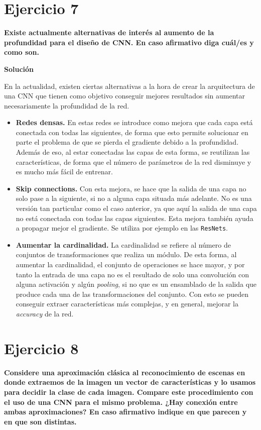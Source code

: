 \documentclass[11pt,a4paper]{article}
\newcommand{\answer}{\noindent\textbf{Solución}}
\newcommand{\question}[1]{\noindent\textbf{#1}}
\newcommand{\nonumsection}[1]{\section*{#1}\addcontentsline{toc}{section}{#1}}
\begin{document}
\nonumsection{Ejercicio 7}

\question{Existe actualmente alternativas de interés al aumento de la
profundidad para el diseño de CNN. En caso afirmativo diga cuál/es y
como son.}

\answer

En la actualidad, existen ciertas alternativas a la hora de crear la arquitectura
de una CNN que tienen como objetivo conseguir mejores resultados sin aumentar
necesariamente la profundidad de la red.

\begin{itemize}[label=\textbullet]
  \item \textbf{Redes densas.} \cite{DBLP:journals/corr/HuangLW16a}
  En estas redes se introduce como mejora
  que cada capa está conectada con todas las siguientes, de
  forma que esto permite solucionar en parte el problema de que se pierda
  el gradiente debido a la profundidad. Además de eso, al estar conectadas
  las capas de esta forma, se reutilizan las características, de forma que
  el número de parámetros de la red disminuye y es mucho más fácil de entrenar.
  \item \textbf{Skip connections.} Con esta mejora, se hace que la salida
  de una capa no solo pase a la siguiente, si no a alguna capa situada
  más adelante. No es una versión tan particular como el caso anterior,
  ya que aquí la salida de una capa no está conectada con todas las
  capas siguientes. Esta mejora también ayuda a propagar mejor el gradiente.
  Se utiliza por ejemplo en las \texttt{ResNets}.
  \item \textbf{Aumentar la cardinalidad.} \cite{DBLP:journals/corr/XieGDTH16}
  La cardinalidad se refiere al número de conjuntos de transformaciones que
  realiza un módulo. De esta forma, al aumentar la cardinalidad, el conjunto de
  operaciones se hace mayor, y por tanto la entrada de una capa no es el resultado
  de solo una convolución con alguna activación y algún \textit{pooling}, si no que
  es un ensamblado de la salida que produce cada una de las transformaciones del
  conjunto. Con esto se pueden conseguir extraer características más complejas,
  y en general, mejorar la \textit{accuracy} de la red.
\end{itemize}


\nonumsection{Ejercicio 8}

\question{Considere una aproximación clásica al reconocimiento de escenas
en donde extraemos de la imagen un vector de características y lo
usamos para decidir la clase de cada imagen. Compare este
procedimiento con el uso de una CNN para el mismo problema. ¿Hay
conexión entre ambas aproximaciones? En caso afirmativo indique en
que parecen y en que son distintas.}
\end{document}
